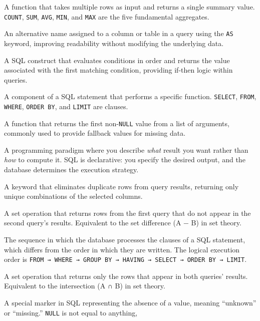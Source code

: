 \documentclass[
  letterpaper,
  DIV=11,
  numbers=noendperiod]{scrreprt}
\providecommand{\tightlist}{%
  \setlength{\itemsep}{0pt}\setlength{\parskip}{0pt}}
\begin{document}
\begin{description}
\tightlist
\item[\textbf{Aggregate Function}]
A function that takes multiple rows as input and returns a single
summary value. \texttt{COUNT}, \texttt{SUM}, \texttt{AVG}, \texttt{MIN},
and \texttt{MAX} are the five fundamental aggregates.
\item[\textbf{Alias}]
An alternative name assigned to a column or table in a query using the
\texttt{AS} keyword, improving readability without modifying the
underlying data.
\item[\textbf{CASE Expression}]
A SQL construct that evaluates conditions in order and returns the value
associated with the first matching condition, providing if-then logic
within queries.
\item[\textbf{Clause}]
A component of a SQL statement that performs a specific function.
\texttt{SELECT}, \texttt{FROM}, \texttt{WHERE}, \texttt{ORDER\ BY}, and
\texttt{LIMIT} are clauses.
\item[\textbf{COALESCE}]
A function that returns the first non-\texttt{NULL} value from a list of
arguments, commonly used to provide fallback values for missing data.
\item[\textbf{Declarative Language}]
A programming paradigm where you describe \emph{what} result you want
rather than \emph{how} to compute it. SQL is declarative: you specify
the desired output, and the database determines the execution strategy.
\item[\textbf{DISTINCT}]
A keyword that eliminates duplicate rows from query results, returning
only unique combinations of the selected columns.
\item[\textbf{EXCEPT}]
A set operation that returns rows from the first query that do not
appear in the second query's results. Equivalent to the set difference
(A − B) in set theory.
\item[\textbf{Execution Order}]
The sequence in which the database processes the clauses of a SQL
statement, which differs from the order in which they are written. The
logical execution order is
\texttt{FROM\ →\ WHERE\ →\ GROUP\ BY\ →\ HAVING\ →\ SELECT\ →\ ORDER\ BY\ →\ LIMIT}.
\item[\textbf{INTERSECT}]
A set operation that returns only the rows that appear in both queries'
results. Equivalent to the intersection (A ∩ B) in set theory.
\item[\textbf{NULL}]
A special marker in SQL representing the absence of a value, meaning
``unknown'' or ``missing.'' \texttt{NULL} is not equal to anything,

\end{description}
\end{document}
